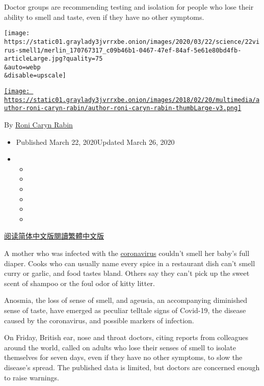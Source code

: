 Doctor groups are recommending testing and isolation for people who lose
their ability to smell and taste, even if they have no other symptoms.

\texttt{[image: https://static01.graylady3jvrrxbe.onion/images/2020/03/22/science/22virus-smell1/merlin\_170767317\_c09b46b1-0467-47ef-84af-5e61e80bd4fb-articleLarge.jpg?quality=75\\\&auto=webp\\\&disable=upscale]}

\href{https://www.nytimes3xbfgragh.onion/by/roni-caryn-rabin}{\texttt{[image: https://static01.graylady3jvrrxbe.onion/images/2018/02/20/multimedia/author-roni-caryn-rabin/author-roni-caryn-rabin-thumbLarge-v3.png]}}

By \href{https://www.nytimes3xbfgragh.onion/by/roni-caryn-rabin}{Roni
Caryn Rabin}

\begin{itemize}
\item
  Published March 22, 2020Updated March 26, 2020
\item
  \begin{itemize}
  \item
  \item
  \item
  \item
  \item
  \item
  \end{itemize}
\end{itemize}

\href{https://cn.nytimes3xbfgragh.onion/health/20200325/coronavirus-symptoms-smell-taste/}{阅读简体中文版}\href{https://cn.nytimes3xbfgragh.onion/health/20200325/coronavirus-symptoms-smell-taste/zh-hant/}{閱讀繁體中文版}

A mother who was infected with the
\href{https://www.nytimes3xbfgragh.onion/article/coronavirus-body-symptoms.html}{coronavirus}
couldn't smell her baby's full diaper. Cooks who can usually name every
spice in a restaurant dish can't smell curry or garlic, and food tastes
bland. Others say they can't pick up the sweet scent of shampoo or the
foul odor of kitty litter.

Anosmia, the loss of sense of smell, and ageusia, an accompanying
diminished sense of taste, have emerged as peculiar telltale signs of
Covid-19, the disease caused by the coronavirus, and possible markers of
infection.

On Friday, British ear, nose and throat doctors, citing reports from
colleagues around the world, called on adults who lose their senses of
smell to isolate themselves for seven days, even if they have no other
symptoms, to slow the disease's spread. The published data is limited,
but doctors are concerned enough to raise warnings.

